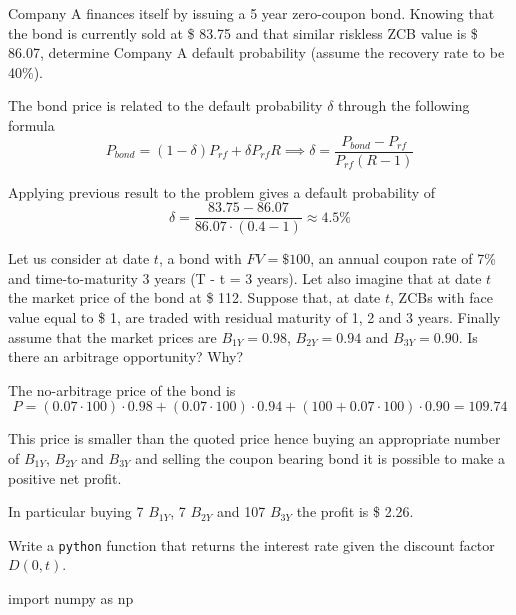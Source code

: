 \documentclass[12pt,a4paper]{exam}
\begin{document}
\begin{questions}
\question
Company A finances itself by issuing a 5 year zero-coupon bond. Knowing that the bond is currently sold at \$ 83.75 and that similar riskless ZCB value is \$ 86.07, determine Company A default probability (assume the recovery rate to be 40\%).
\fillwithlines{3cm}
\begin{solution}
The bond price is related to the default probability $\delta$ through the following formula
\begin{equation*}
  P_{bond} = (1-\delta)P_{rf} + \delta P_{rf} R \implies \delta = \frac{P_{bond}-P_{rf}}{P_{rf}(R-1)}
\end{equation*}

Applying previous result to the problem gives a default probability of
\begin{equation*}
  \delta = \frac{83.75-86.07}{86.07\cdot(0.4-1)} \approx 4.5\% 
\end{equation*}
\end{solution}

\question
Let us consider at date $t$, a bond with $FV = \$ 100$, an annual coupon rate of 7\% and time-to-maturity 3 years (T - t = 3 years).
Let also imagine that at date $t$ the market price of the bond at \$ 112.
Suppose that, at date $t$, ZCBs with face value equal to \$ 1, are traded with residual maturity of 1, 2 and 3 years.
Finally assume that the market prices are $B_{1Y} = 0.98$, $B_{2Y} = 0.94$ and $B_{3Y} = 0.90$.
Is there an arbitrage opportunity? Why?
\fillwithlines{3cm}
\begin{solution}
The no-arbitrage price of the bond is
\begin{equation*}
  P = (0.07\cdot100)\cdot 0.98 + (0.07\cdot100)\cdot 0.94 + (100 + 0.07\cdot100)\cdot 0.90 = 109.74
\end{equation*}

This price is smaller than the quoted price hence buying an appropriate number of $B_{1Y}$, $B_{2Y}$ and $B_{3Y}$ and selling the coupon bearing bond it is possible to make a positive net profit.

In particular buying 7 $B_{1Y}$, 7 $B_{2Y}$ and 107 $B_{3Y}$ the profit is \$ 2.26.
\end{solution}

\question
Write a \texttt{python} function that returns the interest rate given the discount factor $D(0, t)$.
\fillwithlines{3cm}
\begin{solution}
  \begin{ipython}
import numpy as np


\end{ipython}
\end{solution}
\end{questions}
\end{document}
